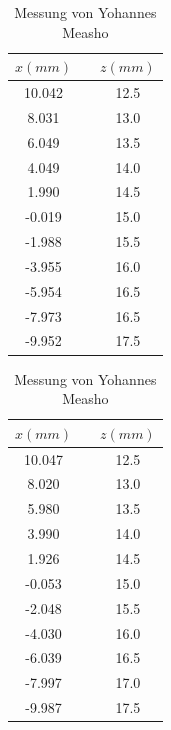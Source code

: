 \begin{table}[H]
    \caption{}
    \begin{subtable}{.5\linewidth}
        \centering
        \caption{Messung von Alex Murray}
        \begin{tabular}{ccc}
            \toprule
            $x (mm)$ & \hspace{5mm} & $z (mm)$ \\
            \midrule
            10.042 && 12.5 \\
            8.031  && 13.0 \\
            6.049  && 13.5 \\
            4.049  && 14.0 \\
            1.990  && 14.5 \\
            -0.019 && 15.0 \\
            -1.988 && 15.5 \\
            -3.955 && 16.0 \\
            -5.954 && 16.5 \\
            -7.973 && 16.5 \\
            -9.952 && 17.5 \\
            \bottomrule
        \end{tabular}
    \end{subtable}%
    \begin{subtable}{.5\linewidth}
        \centering
        \caption{Messung von Yohannes Measho}
        \begin{tabular}{ccc}
            \toprule
            $x (mm)$ & \hspace{5mm} & $z (mm)$ \\
            \midrule
            10.047 && 12.5 \\
            8.020  && 13.0 \\
            5.980  && 13.5 \\
            3.990  && 14.0 \\
            1.926  && 14.5 \\
            -0.053 && 15.0 \\
            -2.048 && 15.5 \\
            -4.030 && 16.0 \\
            -6.039 && 16.5 \\
            -7.997 && 17.0 \\
            -9.987 && 17.5 \\
           \bottomrule
        \end{tabular}
    \end{subtable}
\end{table}



